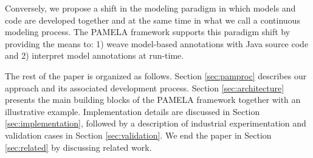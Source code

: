 Conversely, we propose a shift in the modeling paradigm in which models and code are developed together and at the same time in what we call a continuous modeling process. The PAMELA framework supports this paradigm shift by providing the means to: 
1) weave model-based annotations with Java source code
and 2) interpret model annotations at run-time.


The rest of the paper is organized as follows. Section \ref{sec:pamproc} describes our approach and its associated development process. Section \ref{sec:architecture} presents the main building blocks of the PAMELA framework together with an illustrative example. Implementation details are discussed in Section \ref{sec:implementation}, followed by a description of industrial experimentation and validation cases in Section \ref{sec:validation}. We end the paper in Section \ref{sec:related} by discussing related work.
